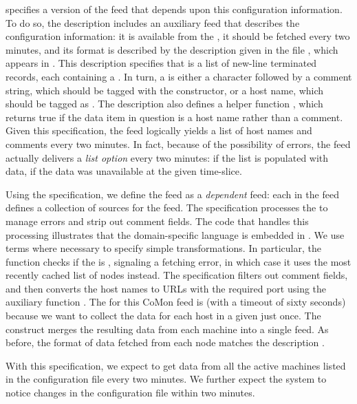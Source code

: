  specifies a version of the  feed that
depends upon this configuration information.  To do so, the
description includes an auxiliary feed  that describes the
configuration information: it is available from the
, it should be fetched every two minutes, and its
format is described by the \padsml{} description  given in
the file , which appears in .
This \padsml{} description specifies that  is a list of
new-line terminated records, each containing a .  In
turn, a  is either a  character followed by a
comment string, which should be tagged with the 
constructor, or a host name, which should be tagged as
. The description also defines a helper function ,
which returns true if the data item in question is a host name
rather than a comment.  Given this specification, the  feed
logically yields a list of host names and comments every two minutes.
In fact, because of the possibility of errors, the feed actually
delivers a {\em list option} every two minutes:  if the list is
populated with data,  if the data was unavailable at the
given time-slice.

Using the  specification, we define the  feed as a
\textit{dependent} feed: each  in the  feed defines a
collection of sources for the  feed.  The  
specification processes the  to manage errors and strip
out comment fields.  The code that handles this processing illustrates
that the \padsd{} domain-specific language is embedded in \ocaml{}.
We use \ocaml{} terms where necessary to specify simple
transformations.  In particular, the  function checks if
the  is , signaling a fetching error, in which
case it uses the most recently cached list of nodes instead.  The
 specification filters out comment fields, and then
converts the host names to URLs with the required port using the
auxiliary function .  The  for this CoMon
feed is  (with a timeout of sixty seconds) because we want to
collect the data for each host in a given  just once.
The  construct merges the resulting data from
each machine into a single feed.  As
before, the format of data fetched from each node matches the
description .  

With this specification, we
expect to get data from all the active machines listed in the
configuration file every two minutes.  We further expect the system to
notice changes in the configuration file within two minutes.

